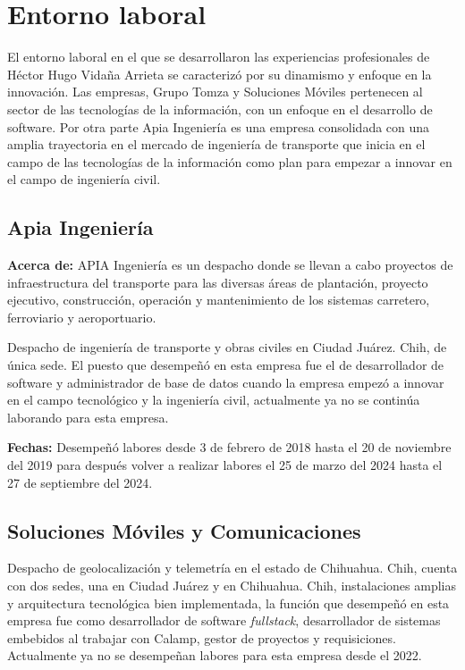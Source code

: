 \documentclass[protocolo.tex]{subfiles}
\begin{document}
\section{Entorno laboral}

El entorno laboral en el que se desarrollaron las experiencias profesionales de Héctor Hugo Vidaña Arrieta se caracterizó por su dinamismo y enfoque en la innovación. Las empresas, Grupo Tomza y Soluciones Móviles pertenecen al sector de las tecnologías de la información, con un enfoque en el desarrollo de software. Por otra parte Apia Ingeniería es una empresa consolidada con una amplia trayectoria en el mercado de ingeniería de transporte que inicia en el campo de las tecnologías de la información como plan para empezar a innovar en el campo de ingeniería civil.

\subsection{Apia Ingeniería}

\textbf{Acerca de:} 
APIA Ingeniería es un despacho donde se llevan a cabo proyectos de infraestructura del transporte para las diversas áreas de plantación, proyecto ejecutivo, construcción, operación y mantenimiento de los sistemas carretero, ferroviario y aeroportuario. \vspace{5mm} 

Despacho de ingeniería de transporte y obras civiles en Ciudad Juárez. Chih, de única sede. El puesto que desempeñó en esta empresa fue el de desarrollador de software y administrador de base de datos cuando la empresa empezó a innovar en el campo tecnológico y la ingeniería civil, actualmente ya no se continúa laborando para esta empresa.

\vspace{5mm} 

\textbf{Fechas:}
Desempeñó labores desde 3 de febrero de 2018 hasta el 20 de noviembre del 2019 para después volver a realizar labores el 25 de marzo del 2024 hasta el 27 de septiembre del 2024.

\subsection{Soluciones Móviles y Comunicaciones}
Despacho de geolocalización y telemetría en el estado de Chihuahua. Chih, cuenta con dos sedes, una en Ciudad Juárez y en Chihuahua. Chih, instalaciones amplias y arquitectura tecnológica bien implementada, la función que desempeñó en esta empresa fue como desarrollador de software \textit{fullstack}, desarrollador de sistemas embebidos al trabajar con Calamp, gestor de proyectos y requisiciones. Actualmente ya no se desempeñan labores para esta empresa desde el 2022.\vspace{5mm} 
\end{document}
